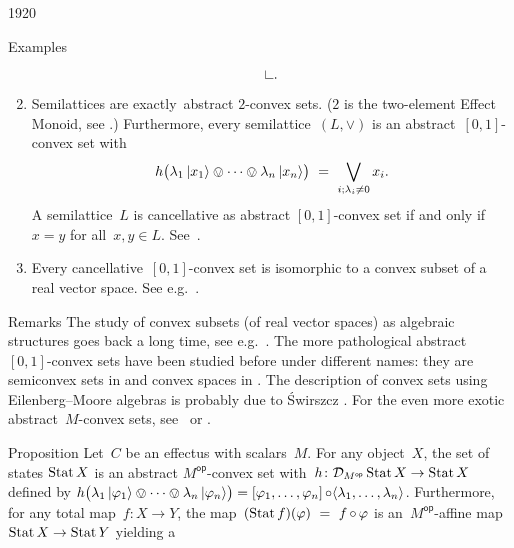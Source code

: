 \begin{parsec}{1920}
\begin{point}{50}{Examples}
\begin{enumerate}
\begin{equation*}
\begin{tikzpicture}[scale=0.2]
    \draw (0,0) -- (0,1) ; 
    \draw (1,0) -- (0,0) ; 
\end{tikzpicture}.
\end{equation*}
\item
Semilattices are exactly~abstract $2$-convex sets.
    ($2$ is the two-element Effect Monoid,
        see .)
Furthermore, every semilattice~$(L, \vee)$
    is an abstract~$[0,1]$-convex set
    with
    \begin{equation*}
    h\bigl(\lambda_1 \ket{x_1} \ovee \cdots \ovee \lambda_n \ket{x_n}\bigr)
        \ =\  \bigvee_{i; \lambda_i \neq 0} x_i.
    \end{equation*}
    A semilattice~$L$ is cancellative as abstract $[0,1]$-convex set
    if and only if~$x=y$ for all~$x,y\in L$.
    See~\cite{neumann1970quasivariety}.
\item
Every cancellative~$[0,1]$-convex set
    is isomorphic to a convex subset of a real vector space.
    See e.g.~\cite[thm.~8]{statesofconvexsets}.
\end{enumerate}
\spacingfix{}
\begin{point}{60}{Remarks}%
The study of
    convex subsets (of real vector spaces)
    as algebraic structures goes back a long time,
        see e.g.~\cite{stone1949postulates,neumann1970quasivariety,flood1981semiconvex,tz2009convex,gudder1979general}.
The more pathological abstract~$[0,1]$-convex sets have been studied before
    under different names:
    they are semiconvex sets in \cite{flood1981semiconvex,swirszcz1975monadic} and
    convex spaces in \cite{tz2009convex}.
The description of convex sets using Eilenberg--Moore algebras is probably
    due to \'Swirszcz \cite{swirszcz1975monadic}.
For the even more exotic abstract~$M$-convex
    sets, see~\cite{effintro} or
        \cite{probdistrconv}.
\end{point}
\end{point}
\begin{point}{70}{Proposition}%
Let~$C$ be an effectus with scalars~$M$.
For any object~$X$, the set of states
$\operatorname{Stat} X$ is an abstract $M^{\mathsf{op}}$-convex set
with~$h\colon \mathcal{D}_{M^{\mathsf{op}}} \operatorname{Stat} X \to \operatorname{Stat} X$
    defined by
    $h\bigl( \lambda_1 \ket{\varphi_1} \ovee \cdots \ovee \lambda_n \ket{\varphi_n} \bigr)
     =  [\varphi_1, \ldots, \varphi_n] \mathop{\circ} \langle
                    \lambda_1, \ldots, \lambda_n\rangle$.
Furthermore,
    for any total map~$f\colon X \to Y$,
    the map~$ (\operatorname{Stat} f)(\varphi) \ = \ f \mathop{\circ} \varphi$
    is an~$M^{\mathsf{op}}$-affine map~$\operatorname{Stat} X \to \operatorname{Stat} Y$ yielding a

\end{point}
\end{parsec}
